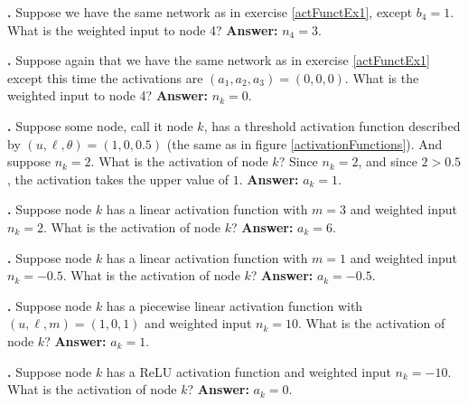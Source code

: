 \bigskip

\noindent

{\bf \theActFunctionCounter.} Suppose we have the same network as in exercise \ref{actFunctEx1}, except 
$b_4 = 1$. What is the weighted input to node 4? {\bf Answer:} $n_4=3$.

\bigskip

\noindent
{\bf \theActFunctionCounter.} Suppose again that we have the same network as in exercise \ref{actFunctEx1} except this time the activations are $(a_1,a_2,a_3) = (0,0,0)$. What is the 
weighted input to node 4? {\bf Answer:} $n_k=0$.

\bigskip

\noindent
{\bf \theActFunctionCounter.} Suppose some node, call it node $k$, has a threshold 
activation function described by $(u,\ell,\theta) = (1,0,0.5)$ (the same as in 
figure \ref{activationFunctions}). And suppose $n_k = 2$. What is the activation 
of node $k$?  Since $n_k = 2$, and since $2 > 0.5$, the activation takes the 
upper value of $1$. {\bf Answer:} $a_k=1$.

\bigskip

\noindent
{\bf \theActFunctionCounter.} Suppose node $k$ has a linear activation function with
$m=3$ and weighted input $n_k = 2$. What is the activation of node $k$? {\bf 
Answer:} $a_k=6$.

\bigskip

\noindent
{\bf \theActFunctionCounter.} Suppose node $k$ has a linear activation function with
$m=1$ and weighted input $n_k = -0.5$. What is the activation of node $k$? {\bf 
Answer:} $a_k = -0.5$.

\bigskip


\label{actFunctEx2}
\noindent
{\bf \theActFunctionCounter.} Suppose node $k$ has a piecewise linear activation function with $(u,\ell,m) = (1,0,1)$ and weighted input $n_k = 10$. What is the activation of node $k$? {\bf 
Answer:} $a_k = 1$.

\bigskip

\noindent
{\bf \theActFunctionCounter.} Suppose node $k$ has a ReLU activation function and weighted input $n_k = -10$. What is the activation of node $k$? {\bf 
Answer:} $a_k = 0$.

